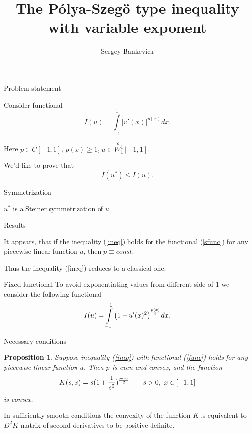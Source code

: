 \documentclass{beamer}\usepackage[]{graphicx}\usepackage[]{color}
\title{The P\'olya-Szeg\"o type inequality with variable exponent}
\author{Sergey Bankevich}
\institute{Saint Petersburg State University, Russia}
\renewcommand{\ge}{\geqslant}
\renewcommand{\le}{\leqslant}
\newcommand{\Wf}{\stackrel{o\ }{W{}_1^1}}
\newtheorem{prop}{Proposition}
\begin{document}
\begin{frame}
  \titlepage
\end{frame}


\begin{frame}{Problem statement}

Consider functional
{\Large 
\begin{equation}
I(u) = \int\limits_{-1}^1 |u'(x)|^{p(x)} dx.
\label{sfunc}
\end{equation}
}

Here $p \in C[-1, 1]$, $p(x) \ge 1$, $u \in \Wf[-1, 1]$.

\pause

\bigskip
We'd like to prove that
{\Large 
\begin{equation}
I(u^*) \le I(u).
\label{ineq}
\end{equation}
}

\end{frame}


\begin{frame}{Symmetrization}

$u^*$ is a Steiner symmetrization of $u$.

\end{frame}


\begin{frame}{Results}

It appears, that if the inequality (\ref{ineq}) holds for the functional (\ref{sfunc}) for any piecewise linear function $u$,
then $p \equiv const$.

Thus the inequality (\ref{ineq}) reduces to a classical one.

\end{frame}

\begin{frame}{Fixed functional}
To avoid exponentiating values from different side of $1$ we consider the following functional
{\Large
\begin{equation}
I(u) = \int\limits_{-1}^1 \big(1 + u'(x)^2 \big)^{p(x) \over 2} dx.
\label{func}
\end{equation}
}

\end{frame}

\begin{frame}{Necessary conditions}

\begin{prop}
Suppose inequality (\ref{ineq}) with functional (\ref{func}) holds for any piecewise linear function $u$.
Then $p$ is even and convex,
and the function
$$K(s, x) = s ( 1 + { 1 \over s^2 } )^{p(x) \over 2} \qquad s > 0,\ x \in [-1, 1]$$
is convex.
\end{prop}

In sufficiently smooth conditions the convexity of the function $K$ is equivalent to 
$D^2 K$ matrix of second derivatives to be positive definite.

\end{frame}
\end{document}

